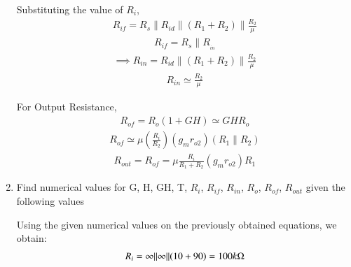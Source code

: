 \begin{enumerate}[label=\thesubsection.\arabic*.,ref=\thesubsection.\theenumi]
Substituting the value of $R_{i}$,
\begin{align}
    R_{if}=R_{s}\|R_{id}\|(R_{1}+R_{2}) \| \frac{R_{2}}{\mu}
\end{align}
\begin{align}
    R_{if}=R_{s} \| R__{in}
\end{align}
\begin{align}
    \implies R_{in}=R_{i d}\|(R_{1}+R_{2})\| \frac{R_{2}}{\mu}
\end{align}
\begin{align}
    R_{in} \simeq \frac{R_{2}}{\mu}
\end{align}

For Output Resistance,
\begin{align}
    R_{of}=R_{o}(1+GH) \simeq GH R_{o}
\end{align}
\begin{align}
    R_{of} \simeq \mu (\frac{R_{i}}{R_{2}})(g_{m} r_{o 2})(R_{1} \| R_{2})
\end{align}
\begin{align}
    R_{out} = R_{of}=\mu \frac{R_{i}}{R_{1}+R_{2}}(g_{m} r_{o 2}) R_{1}
\end{align}

\item
Find numerical values for G, H, GH, T, $R_{i}$, $R_{if}$, $R_{in}$, $R_{o}$,  $R_{of}$, $R_{out}$ given the following values
\begin{table}[!ht]
\centering

\caption{}
\label{table: Input_Table}
\end{table}

\solution
Using the given numerical values on the previously obtained equations, we obtain:
\begin{align}
    R_{i}=\infty\|\infty\|(10+90)=100 k\ohm
\end{align}


\end{enumerate}
